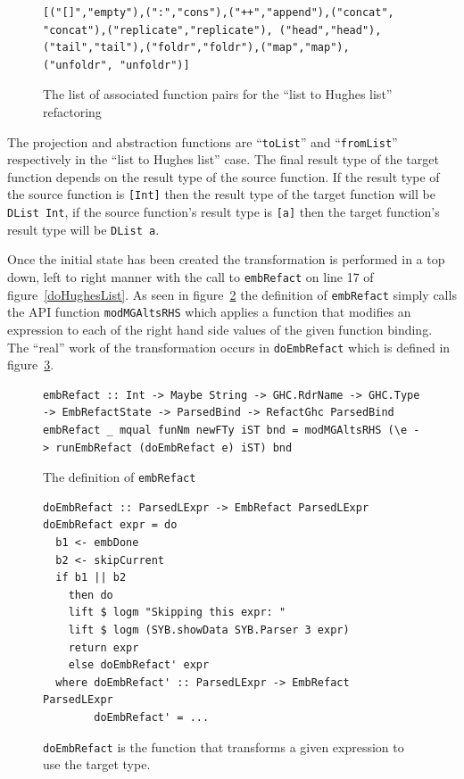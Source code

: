 \begin{figure}[t]
\begin{lstlisting}
[("[]","empty"),(":","cons"),("++","append"),("concat", "concat"),("replicate","replicate"), ("head","head"),("tail","tail"),("foldr","foldr"),("map","map"), ("unfoldr", "unfoldr")]
\end{lstlisting}
\caption{The list of associated function pairs for the ``list to Hughes list'' refactoring}
\label{assocFuns}
\end{figure} 

The projection and abstraction functions are ``\texttt{toList}'' and ``\texttt{fromList}'' respectively in the ``list to Hughes list'' case. The final result type of the target function depends on the result type of the source function. If the result type of the source function is \texttt{[Int]} then the result type of the target function will be \texttt{DList Int}, if the source function's result type is \texttt{[a]} then the target function's result type will be \texttt{DList a}.

Once the initial state has been created the transformation is performed in a top down, left to right manner with the call to \texttt{embRefact} on line 17 of figure~\ref{doHughesList}. As seen in figure~\ref{embRefact} the definition of \texttt{embRefact} simply calls the API function \texttt{modMGAltsRHS} which applies a function that modifies an expression to each of the right hand side values of the given function binding. The ``real'' work of the transformation occurs in \texttt{doEmbRefact} which is defined in figure~\ref{doEmbRefact}.

\begin{figure}[t]
\begin{lstlisting}
embRefact :: Int -> Maybe String -> GHC.RdrName -> GHC.Type -> EmbRefactState -> ParsedBind -> RefactGhc ParsedBind
embRefact _ mqual funNm newFTy iST bnd = modMGAltsRHS (\e -> runEmbRefact (doEmbRefact e) iST) bnd
\end{lstlisting}
\caption{The definition of \texttt{embRefact}}
\label{embRefact}
\end{figure}

\begin{figure}[t]
\begin{lstlisting}
doEmbRefact :: ParsedLExpr -> EmbRefact ParsedLExpr
doEmbRefact expr = do
  b1 <- embDone
  b2 <- skipCurrent
  if b1 || b2
    then do
    lift $ logm "Skipping this expr: "
    lift $ logm (SYB.showData SYB.Parser 3 expr)
    return expr
    else doEmbRefact' expr
  where doEmbRefact' :: ParsedLExpr -> EmbRefact ParsedLExpr
  		doEmbRefact' = ...
\end{lstlisting}
\caption{\texttt{doEmbRefact} is the function that transforms a given expression to use the target type.}
\label{doEmbRefact}
\end{figure}

